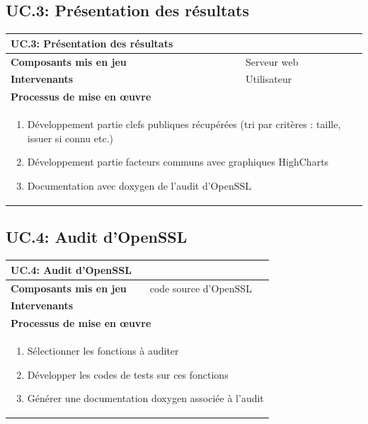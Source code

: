 \documentclass[a4paper,11pt,french]{article}
\begin{document}
\subsection{UC.3: Présentation des résultats}
\begin{center}
	\vspace*{0.7cm}
	\begin{tabularx}{16cm}{|l|X|}
	\hline
	\multicolumn{2}{|l|}{\textbf{UC.3: Présentation des résultats}}\\
	\hline
	\textbf{Composants mis en jeu} & Serveur web\\
	\hline
	\textbf{Intervenants} & Utilisateur\\
	\hline
	\multicolumn{2}{|l|}{\textbf{Processus de mise en \oe uvre}}\\
	\hline
	\multicolumn{2}{|p{15cm}|}{
	\begin{enumerate} 
	\item Développement partie clefs publiques récupérées (tri par critères : taille, issuer si connu etc.)
	\item Développement partie facteurs communs avec graphiques HighCharts
	\item Documentation avec doxygen de l'audit d'OpenSSL
	\end{enumerate}
	}\\
	\hline
	\end{tabularx}
\end{center}


\subsection{UC.4: Audit d'OpenSSL}
\begin{center}
	\vspace*{0.7cm}
	\begin{tabularx}{16cm}{|l|X|}
	\hline
	\multicolumn{2}{|l|}{\textbf{UC.4: Audit d'OpenSSL}}\\
	\hline
	\textbf{Composants mis en jeu} & code source d'OpenSSL\\
	\hline
	\textbf{Intervenants} & \\
	\hline
	\multicolumn{2}{|l|}{\textbf{Processus de mise en \oe uvre}}\\
	\hline
	\multicolumn{2}{|p{15cm}|}{
	\begin{enumerate}
	\item Sélectionner les fonctions à auditer
	\item Développer les codes de tests sur ces fonctions
	\item Générer une documentation doxygen associée à l'audit
	\end{enumerate}
	}\\
	\hline
	\end{tabularx}
\end{center}
\end{document}

